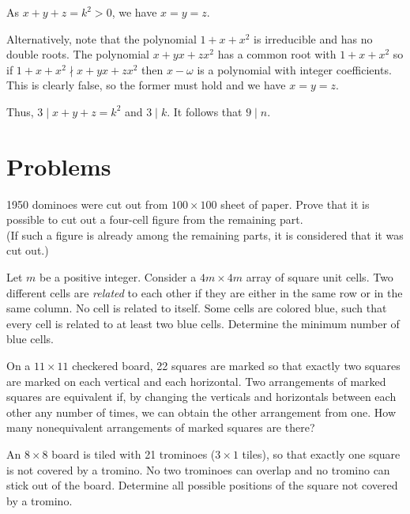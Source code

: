 As $x+y+z=k^2>0$, we have $x=y=z$.

Alternatively, note that the polynomial $1+x+x^2$ is irreducible and has no double roots. The polynomial $x+yx+zx^2$ has a common root with $1+x+x^2$ so if $1+x+x^2\nmid x+yx+zx^2$ then $x-\omega$ is a polynomial with integer coefficients. This is clearly false, so the former must hold and we have $x=y=z$.

Thus, $3\mid x+y+z=k^2$ and $3\mid k$. It follows that $9\mid n$.

\section{Problems}

\begin{problem}
    1950 dominoes were cut out from $100\times 100$ sheet of paper. Prove that it is possible to cut out a four-cell figure from the remaining part.\\ (If such a figure is already among the remaining parts, it is considered that it was cut out.)
\end{problem}

\begin{problem}[EGMO 2016]
    Let $m$ be a positive integer. Consider a $4m\times 4m$ array of square unit cells. Two different cells are \textit{related} to each other if they are either in the same row or in the same column. No cell is related to itself. Some cells are colored blue, such that every cell is related to at least two blue cells. Determine the minimum number of blue cells.
\end{problem}

\begin{problem}
    On a $11\times 11$ checkered board, 22 squares are marked so that exactly two squares are marked on each vertical and each horizontal. Two arrangements of marked squares are equivalent if, by changing the verticals and horizontals between each other any number of times, we can obtain the other arrangement from one. How many nonequivalent arrangements of marked squares are there?
\end{problem}

\begin{problem}
    An $8\times 8$ board is tiled with 21 trominoes ($3\times 1$ tiles), so that exactly one square is not covered by a tromino. No two trominoes can overlap and no tromino can stick out of the board. Determine all possible positions of the square not covered by a tromino.
\end{problem}


